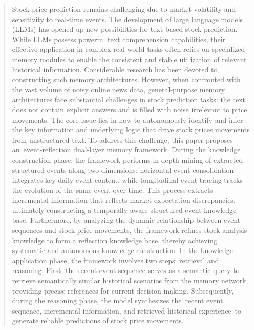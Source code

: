 \documentclass[sigconf, nonacm]{acmart} %
\begin{document}
\begin{abstract}
 Stock price prediction remains challenging due to market volatility and sensitivity to real-time events. 
  The development of large language models (LLMs) has opened up new possibilities for text-based stock prediction. While LLMs possess powerful text comprehension capabilities, their effective application in complex real-world tasks often relies on specialized memory modules to enable the consistent and stable utilization of relevant historical information. 
  Considerable research has been devoted to constructing such memory architectures.
  However, when confronted with the vast volume of noisy online news data, general-purpose memory architectures face substantial challenges in stock prediction tasks: the text does not contain explicit answers and is filled with noise irrelevant to price movements. The core issue lies in how to autonomously identify and infer the key information and underlying logic that drive stock prices movements from unstructured text.
  To address this challenge, this paper proposes an event-reflection dual-layer memory framework. During the knowledge construction phase, the framework performs in-depth mining of extracted structured events along two dimensions: horizontal event consolidation integrates key daily event content, while longitudinal event tracing tracks the evolution of the same event over time. This process extracts incremental information that reflects market expectation discrepancies, ultimately constructing a temporally-aware structured event knowledge base. Furthermore, by analyzing the dynamic relationship between event sequences and stock price movements, the framework refines stock analysis knowledge to form a reflection knowledge base, thereby achieving systematic and autonomous knowledge construction.
  In the knowledge application phase, the framework involves two steps: retrieval and reasoning. First, the recent event sequence serves as a semantic query to retrieve semantically similar historical scenarios from the memory network, providing precise references for current decision-making. Subsequently, during the reasoning phase, the model synthesizes the recent event sequence, incremental information, and retrieved historical experience to generate reliable predictions of stock price movements.

\end{abstract}
\end{document}
